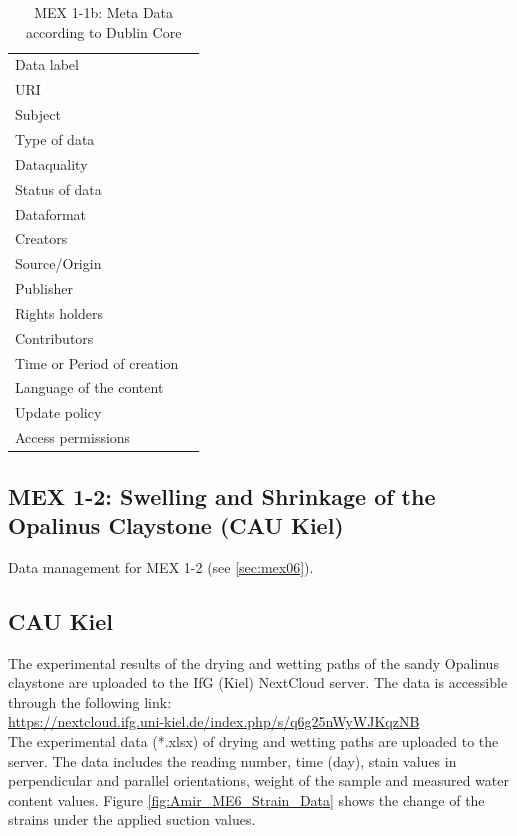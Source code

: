 \begin{table}[!ht]
\caption{MEX 1-1b: Meta Data according to Dublin Core}
\label{tab:dms-mex1-1b}
\small
\begin{tabular}{R{3cm}|L{7cm}}
\hline
%
Data label &  \\
URI &  \\
Subject  &  \\
Type of data  &  \\
Dataquality  &  \\
Status of data  &  \\
Dataformat  & \\
Creators  &  \\
Source/Origin &  \\
Publisher  &  \\
Rights holders &  \\
Contributors &  \\
Time or Period of creation &  \\
Language of the content &  \\
Update policy &  \\
Access permissions &  \\
%
\hline
\end{tabular}
\end{table}

\subsection{MEX 1-2: Swelling and Shrinkage of the Opalinus Claystone (CAU Kiel)}

Data management for MEX 1-2 (see \ref{sec:mex06}).

\subsection*{CAU Kiel}

The experimental results of the drying and wetting paths of the sandy Opalinus claystone are uploaded to the IfG (Kiel) NextCloud server. The data is accessible through the following link:\\
\hyperlink{https://nextcloud.ifg.uni-kiel.de/index.php/s/q6g25nWyWJKqzNB}{https://nextcloud.ifg.uni-kiel.de/index.php/s/q6g25nWyWJKqzNB}\\

The experimental data (*.xlsx) of drying and wetting paths are uploaded to the server. The data includes the reading number, time (day), stain values in perpendicular and parallel orientations, weight of the sample and measured water content values. Figure \ref{fig:Amir_ME6_Strain_Data} shows the change of the strains under the applied suction values.

